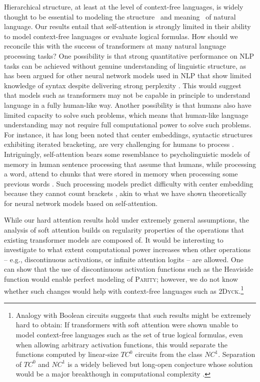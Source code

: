 \documentclass[11pt,a4paper]{article}
\begin{document}
Hierarchical structure, at least at the level of context-free languages, is widely thought to be essential to modeling the structure~\cite{everaert2015structures} and meaning~\cite{montague1973proper} of natural language.
Our results entail that self-attention is strongly limited in their ability to model context-free languages or evaluate logical formulas.
How should we reconcile this with the success of transformers at many natural language processing tasks?
One possibility is that strong quantitative performance on NLP tasks can be achieved without genuine understanding of linguistic structure, as has been argued for other neural network models used in NLP that show limited knowledge of syntax despite delivering strong perplexity  \cite{linzen2016assessing,marvin2018targeted}.
This would suggest that models such as transformers may not be capable in principle to understand language in a fully human-like way.
Another possibility is that humans also have limited capacity to solve such problems, which means that human-like language understanding may not require full computational power to solve such problems.
For instance, it has long been noted that center embeddings, syntactic structures exhibiting iterated bracketing, are very challenging for humans to process \cite{miller-finitary-1963,gibson1999memory}.
Intriguingly, self-attention bears some resemblance to psycholinguistic models of memory in human sentence processing that assume that humans, while processing a word, attend to chunks that were stored in memory when processing some previous words \cite{lewis2005activation,parker2017cue}.
Such processing models predict difficulty with center embedding because they cannot count brackets \cite{lewis2005activation}, akin to what we have shown theoretically for neural network models based on self-attention.



While our hard attention results hold under extremely general assumptions, the analysis of soft attention builds on regularity properties of the operations that existing transformer models are composed of.
It would be interesting to investigate to what extent computational power increases when other operations -- e.g., discontinuous activations, or infinite attention logits -- are allowed.
One can show that the use of discontinuous activation functions such as the Heaviside function would enable perfect modeling of \textsc{Parity}; however, we do not know whether such changes would help with context-free languages such as \textsc{2Dyck}.\footnote{Analogy with Boolean circuits suggests that such results might be extremely hard to obtain: If transformers with soft attention were shown unable to model context-free languages such as the set of true logical formulas, even when allowing arbitrary activation functions, this would separate the functions computed by linear-size $TC^0$ circuits from the class $NC^1$. Separation of $TC^0$ and $NC^1$ is a widely believed but long-open conjecture whose solution would be a major breakthough in computational complexity \cite{arora2009computational}.}
\end{document}
